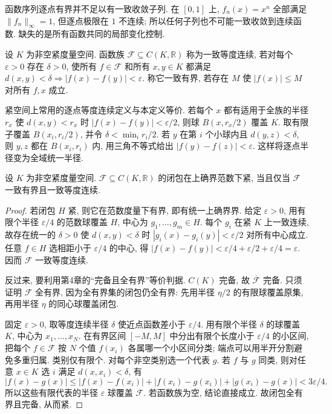 函数序列逐点有界并不足以有一致收敛子列. 在 $[0,1]$ 上, $f_n(x)=x^n$ 全部满足 $\lVert f_n\rVert_\infty=1$, 但逐点极限在 $1$ 不连续; 所以任何子列也不可能一致收敛到连续函数. 缺失的是所有函数共同的局部变化控制.

\begin{definition}
设 $K$ 为非空紧度量空间. 函数族 $\mathcal F\subseteq C(K,\mathbb R)$ 称为一致等度连续, 若对每个 $\varepsilon>0$ 存在 $\delta>0$, 使所有 $f\in\mathcal F$ 和所有 $x,y\in K$ 都满足
$d(x,y)<\delta\Rightarrow |f(x)-f(y)|<\varepsilon$.
称它一致有界, 若存在 $M$ 使 $|f(x)|\le M$ 对所有 $f,x$ 成立.
\end{definition}
紧空间上常用的逐点等度连续定义与本定义等价. 若每个 $x$ 都有适用于全族的半径 $r_x$ 使 $d(x,y)<r_x$ 时 $|f(x)-f(y)|<\varepsilon/2$, 则球 $B(x,r_x/2)$ 覆盖 $K$. 取有限子覆盖 $B(x_i,r_i/2)$, 并令 $\delta<\min_i r_i/2$. 若 $y$ 在第 $i$ 个小球内且 $d(y,z)<\delta$, 则 $y,z$ 都在 $B(x_i,r_i)$ 内, 用三角不等式给出 $|f(y)-f(z)|<\varepsilon$. 这样将逐点半径变为全域统一半径.

\begin{theorem}\label{thm:ascoli}
设 $K$ 为非空紧度量空间. $\mathcal F\subseteq C(K,\mathbb R)$ 的闭包在上确界范数下紧, 当且仅当 $\mathcal F$ 一致有界且一致等度连续.
\end{theorem}
\begin{proof}
若闭包 $H$ 紧, 则它在范数度量下有界, 即有统一上确界界. 给定 $\varepsilon>0$, 用有限个半径 $\varepsilon/4$ 的范数球覆盖 $H$, 中心为 $g_1,\ldots,g_m\in H$. 每个 $g_i$ 在紧 $K$ 上一致连续, 故存在统一的 $\delta>0$ 使 $d(x,y)<\delta$ 时 $|g_i(x)-g_i(y)|<\varepsilon/2$ 对所有中心成立. 任意 $f\in H$ 选相距小于 $\varepsilon/4$ 的中心, 得
$|f(x)-f(y)|<\varepsilon/4+\varepsilon/2+\varepsilon/4=\varepsilon$. 因而 $\mathcal F$ 一致等度连续.

反过来, 要利用第4章的“完备且全有界”等价判据. $C(K)$ 完备, 故 $\overline{\mathcal F}$ 完备. 只须证明 $\mathcal F$ 全有界, 因为全有界集的闭包仍全有界: 先用半径 $\eta/2$ 的有限球覆盖原集, 再用半径 $\eta$ 的同心球覆盖闭包.

固定 $\varepsilon>0$, 取等度连续半径 $\delta$ 使近点函数差小于 $\varepsilon/4$. 用有限个半径 $\delta$ 的球覆盖 $K$, 中心为 $x_1,\ldots,x_N$. 在有界区间 $[-M,M]$ 中分出有限个长度小于 $\varepsilon/4$ 的小区间, 把每个 $f\in\mathcal F$ 按 $N$ 个值 $f(x_i)$ 各属哪一个小区间分类; 端点可以用半开分割避免多重归属. 类别仅有限个. 对每个非空类别选一个代表 $g$. 若 $f$ 与 $g$ 同类, 则对任意 $x\in K$ 选 $i$ 满足 $d(x,x_i)<\delta$, 有
\[
 |f(x)-g(x)|\le |f(x)-f(x_i)|+|f(x_i)-g(x_i)|+|g(x_i)-g(x)|<3\varepsilon/4.
\]
所以这些有限代表的半径 $\varepsilon$ 球覆盖 $\mathcal F$. 若函数族为空, 结论直接成立. 故闭包全有界且完备, 从而紧.
\end{proof}

